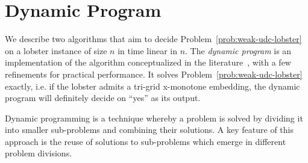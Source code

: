 \chapter{Dynamic Program}
\label{ch:dynprog}

We describe two algorithms that aim to decide Problem~\ref{prob:weak-udc-lobster} on a lobster instance of size $n$ in time linear in $n$. The \emph{dynamic program} is an implementation of the algorithm conceptualized in the literature~\cite{Bhore2021}, with a few refinements for practical performance. It solves Problem~\ref{prob:weak-udc-lobster} exactly, i.e. if the lobster admits a tri-grid x-monotone embedding, the dynamic program will definitely decide on ``yes'' as its output.

Dynamic programming is a technique whereby a problem is solved by dividing it into smaller sub-problems and combining their solutions.
A key feature of this approach is the reuse of solutions to sub-problems which emerge in different problem divisions.

